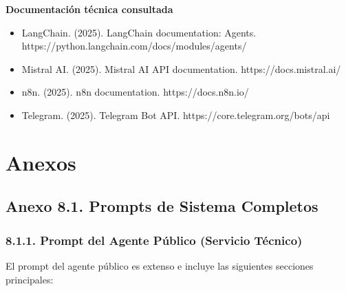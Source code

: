 \documentclass[12pt,a4paper]{report}
\begin{document}
\noindent\textbf{Documentación técnica consultada}

\begin{itemize}
  \item LangChain. (2025). LangChain documentation: Agents. https://python.langchain.com/docs/modules/agents/
  \item Mistral AI. (2025). Mistral AI API documentation. https://docs.mistral.ai/
  \item n8n. (2025). n8n documentation. https://docs.n8n.io/
  \item Telegram. (2025). Telegram Bot API. https://core.telegram.org/bots/api
\end{itemize}

\chapter*{Anexos}

\section*{Anexo 8.1. Prompts de Sistema Completos}
\label{anexo:prompts}

\subsection*{8.1.1. Prompt del Agente Público (Servicio Técnico)}

El prompt del agente público es extenso e incluye las siguientes secciones principales:
\end{document}
